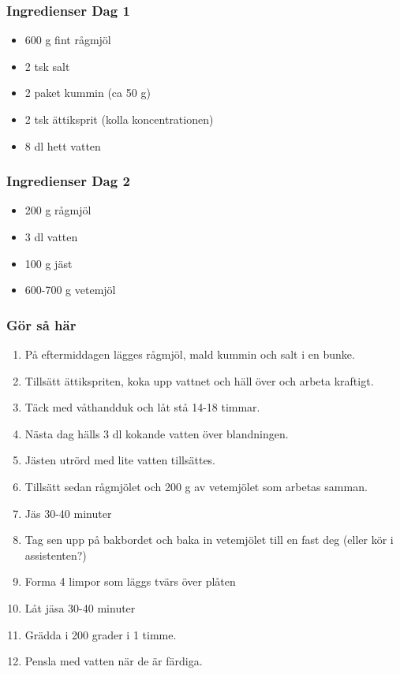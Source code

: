 \documentclass[a4paper,11pt,twocolumn]{article}
\begin{document}
\subsubsection*{Ingredienser Dag 1}
\begin{itemize}[noitemsep]
    \item 600 g fint rågmjöl
    \item 2 tsk salt
    \item 2 paket kummin (ca 50 g)
    \item 2 tsk ättiksprit (kolla koncentrationen)
    \item 8 dl hett vatten
\end{itemize}
\subsubsection*{Ingredienser Dag 2}
\begin{itemize}[noitemsep]
    \item 200 g rågmjöl
    \item 3 dl vatten
    \item 100 g jäst
    \item 600-700 g vetemjöl
\end{itemize}
\subsubsection*{Gör så här}
\begin{enumerate}[label=\arabic*.]
    \item På eftermiddagen lägges rågmjöl, mald kummin och salt i en bunke.
    \item Tillsätt ättikspriten, koka upp vattnet och häll över och arbeta kraftigt.
    \item Täck med våthandduk och låt stå 14-18 timmar.
    \item Nästa dag hälls 3 dl kokande vatten över blandningen.
    \item Jästen utrörd med lite vatten tillsättes.
    \item Tillsätt sedan rågmjölet och 200 g av vetemjölet som arbetas samman.
    \item Jäs 30-40 minuter
    \item Tag sen upp på bakbordet och baka in vetemjölet till en fast deg (eller kör i assistenten?)
    \item Forma 4 limpor som läggs tvärs över plåten
    \item Låt jäsa 30-40 minuter
    \item Grädda i 200 grader i 1 timme.
    \item Pensla med vatten när de är färdiga.
\end{enumerate}
\end{document}
